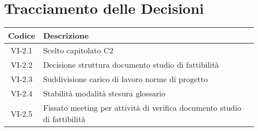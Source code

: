 \section*{Tracciamento delle Decisioni}

\begin{center}
	\begin{longtable}{|c|p{14.5cm}|}
	\hline
	\rowcolor{lighter-grayer}
	\textbf{Codice} & \textbf{Descrizione} \\
	\hline
	\endfirsthead

	\hline
	VI-2.1 & Scelto capitolato C2 \\
	VI-2.2 & Decisione struttura documento studio di fattibilità \\
	VI-2.3 & Suddivisione carico di lavoro norme di progetto \\
	VI-2.4 & Stabilità modalità stesura glossario \\
	VI-2.5 & Fissato meeting per attività di verifica documento studio di fattibilità \\
	\hline

	\end{longtable}
\end{center}